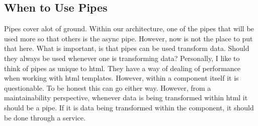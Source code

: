 \subsection{ When to Use Pipes }
Pipes cover alot of ground. Within our architecture, one of the pipes that will
be used more so that others is the async pipe. However, now is not the place
to put that here. What is important, is that pipes can be used transform data.
Should they always be used whenever one is transforming data? Personally,
I like to think of pipes as unique to html. They have a way of dealing of
performance when working with html templates. However, within a component
itself it is questionable. To be honest this can go either way. However, from a
maintainability perspective, whenever data is being transformed within html it
should be a pipe. If it is data being transformed within the component, it
should be done through a service.

